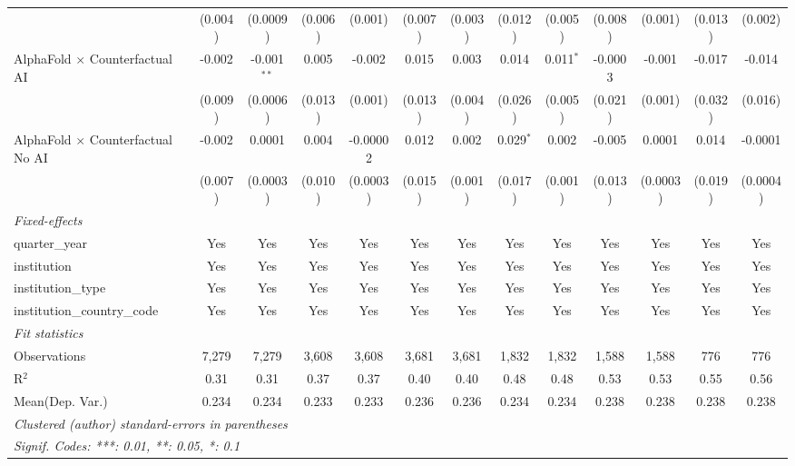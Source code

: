 \begin{tabular}{lcccccccccccc}
                                            & (0.004) & (0.0009)      & (0.006) & (0.001)  & (0.007) & (0.003) & (0.012)     & (0.005)     & (0.008)      & (0.001)        & (0.013) & (0.002)\\   
   AlphaFold $\times$ Counterfactual AI     & -0.002  & -0.001$^{**}$ & 0.005   & -0.002   & 0.015   & 0.003   & 0.014       & 0.011$^{*}$ & -0.0003      & -0.001         & -0.017  & -0.014\\   
                                            & (0.009) & (0.0006)      & (0.013) & (0.001)  & (0.013) & (0.004) & (0.026)     & (0.005)     & (0.021)      & (0.001)        & (0.032) & (0.016)\\   
   AlphaFold $\times$ Counterfactual No AI  & -0.002  & 0.0001        & 0.004   & -0.00002 & 0.012   & 0.002   & 0.029$^{*}$ & 0.002       & -0.005       & 0.0001         & 0.014   & -0.0001\\   
                                            & (0.007) & (0.0003)      & (0.010) & (0.0003) & (0.015) & (0.001) & (0.017)     & (0.001)     & (0.013)      & (0.0003)       & (0.019) & (0.0004)\\   
   \midrule
   \emph{Fixed-effects}\\
   quarter\_year                            & Yes     & Yes           & Yes     & Yes      & Yes     & Yes     & Yes         & Yes         & Yes          & Yes            & Yes     & Yes\\  
   institution                              & Yes     & Yes           & Yes     & Yes      & Yes     & Yes     & Yes         & Yes         & Yes          & Yes            & Yes     & Yes\\  
   institution\_type                        & Yes     & Yes           & Yes     & Yes      & Yes     & Yes     & Yes         & Yes         & Yes          & Yes            & Yes     & Yes\\  
   institution\_country\_code               & Yes     & Yes           & Yes     & Yes      & Yes     & Yes     & Yes         & Yes         & Yes          & Yes            & Yes     & Yes\\  
   \midrule
   \emph{Fit statistics}\\
   Observations                             & 7,279   & 7,279         & 3,608   & 3,608    & 3,681   & 3,681   & 1,832       & 1,832       & 1,588        & 1,588          & 776     & 776\\  
   R$^2$                                    & 0.31    & 0.31          & 0.37    & 0.37     & 0.40    & 0.40    & 0.48        & 0.48        & 0.53         & 0.53           & 0.55    & 0.56\\  
Mean(Dep. Var.) & 0.234 & 0.234 & 0.233 & 0.233 & 0.236 & 0.236 & 0.234 & 0.234 & 0.238 & 0.238 & 0.238 & 0.238 \\
   \midrule \midrule
   \multicolumn{13}{l}{\emph{Clustered (author) standard-errors in parentheses}}\\
   \multicolumn{13}{l}{\emph{Signif. Codes: ***: 0.01, **: 0.05, *: 0.1}}\\
\end{tabular}
\par\endgroup
